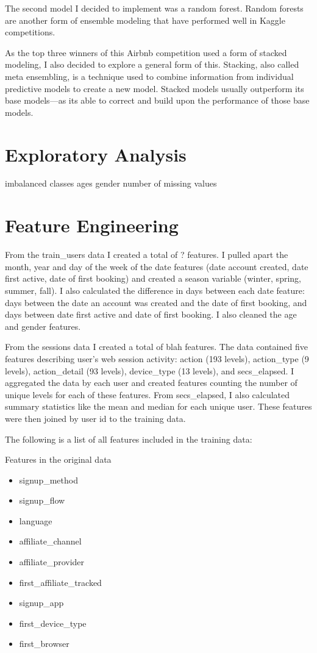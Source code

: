 \documentclass{article}
\begin{document}
The second model I decided to implement was a random forest. Random forests are another form of ensemble 
modeling that have performed well in Kaggle competitions. 

As the top three winners of this Airbnb competition used a form of stacked modeling, I also decided to 
explore a general form of this. Stacking, also called meta ensembling, is a technique used to combine 
information from individual predictive models to create a new model. Stacked models usually outperform 
its base models---as it\textquotesingle s able to correct and build upon the performance of those base models. 

\section{Exploratory Analysis}

imbalanced classes
ages
gender
number of missing values 

\section{Feature Engineering}

From the train\_users data I created a total of ? features. I pulled apart the month, year and day of 
the week of the date features (date account created, date first active, date of first booking) and created 
a season variable (winter, spring, summer, fall). I also calculated the difference in days between each 
date feature:  days between the date an account was created and the date of first booking, and days 
between date first active and date of first booking. I also cleaned the age and gender features. 

From the sessions data I created a total of blah features. The data contained five features describing 
user’s web session activity: action (193 levels), action\_type (9 levels), action\_detail (93 levels), 
device\_type (13 levels), and secs\_elapsed. I aggregated the data by each user and created features 
counting the number of unique levels for each of these features. From secs\_elapsed, I also calculated 
summary statistics like the mean and median for each unique user. These features were then joined by 
user id to the training data. 

The following is a list of all features included in the training data: 

Features in the original data
\begin{itemize}
  \item signup\_method
  \item signup\_flow
  \item language
  \item affiliate\_channel 
  \item affiliate\_provider
  \item first\_affiliate\_tracked
  \item signup\_app
  \item first\_device\_type
  \item first\_browser
\end{itemize}
\end{document}
